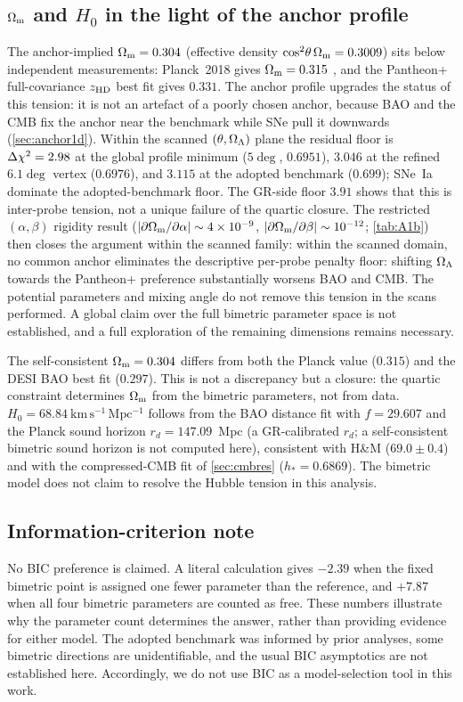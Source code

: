 \subsection[Omega m and H0 in the light of the anchor profile]{\texorpdfstring{$\Omega_{\mathrm m}$}{Omega_m} and \texorpdfstring{$H_0$}{H0} in the light of the anchor profile}\label{sec:Om-H0}
The anchor-implied $\Omega_{\mathrm m}=0.304$ (effective density $\cos^2\!\theta\,\Omega_{\mathrm m}=0.3009$) sits below independent measurements: Planck~2018 gives $\Omega_{\mathrm m}=0.315$ \citep{Planck2018}, and the Pantheon+ full-covariance $z_{\rm HD}$ best fit gives $0.331$. The anchor profile upgrades the status of this tension: it is not an artefact of a poorly chosen anchor, because BAO and the CMB fix the anchor near the benchmark while SNe pull it downwards (\cref{sec:anchor1d}). Within the scanned $(\theta,\Omega_{\Lambda})$ plane the residual floor is $\Delta\chi^2=2.98$ at the global profile minimum ($5\deg$, $0.6951$), $3.046$ at the refined $6.1\deg$ vertex ($0.6976$), and $3.115$ at the adopted benchmark ($0.699$); SNe~Ia dominate the adopted-benchmark floor. The GR-side floor $3.91$ shows that this is inter-probe tension, not a unique failure of the quartic closure. The restricted $(\alpha,\beta)$ rigidity result ($|\partial\Omega_{\mathrm m}/\partial\alpha|\sim4\times10^{-9}$, $|\partial\Omega_{\mathrm m}/\partial\beta|\sim10^{-12}$; \cref{tab:A1b}) then closes the argument within the scanned family: within the scanned domain, no common anchor eliminates the descriptive per-probe penalty floor: shifting $\Omega_{\Lambda}$ towards the Pantheon+ preference substantially worsens BAO and CMB. The potential parameters and mixing angle do not remove this tension in the scans performed. A global claim over the full bimetric parameter space is not established, and a full exploration of the remaining dimensions remains necessary.

The self-consistent $\Omega_{\mathrm m}=0.304$ differs from both the Planck value ($0.315$) and the DESI BAO best fit ($0.297$). This is not a discrepancy but a closure: the quartic constraint determines $\Omega_{\mathrm m}$ from the bimetric parameters, not from data. $H_0=68.84\ \mathrm{km\,s^{-1}\,Mpc^{-1}}$ follows from the BAO distance fit with $f=29.607$ and the Planck sound horizon $r_d=147.09$~Mpc (a GR-calibrated $r_d$; a self-consistent bimetric sound horizon is not computed here), consistent with H\&M ($69.0\pm0.4$) and with the compressed-CMB fit of \cref{sec:cmbres} ($h_*=0.6869$). The bimetric model does not claim to resolve the Hubble tension in this analysis.

\subsection{Information-criterion note}
No BIC preference is claimed. A literal calculation gives $-2.39$ when the fixed bimetric point is assigned one fewer parameter than the \LCDM{} reference, and $+7.87$ when all four bimetric parameters are counted as free. These numbers illustrate why the parameter count determines the answer, rather than providing evidence for either model. The adopted benchmark was informed by prior analyses, some bimetric directions are unidentifiable, and the usual BIC asymptotics are not established here. Accordingly, we do not use BIC as a model-selection tool in this work.

